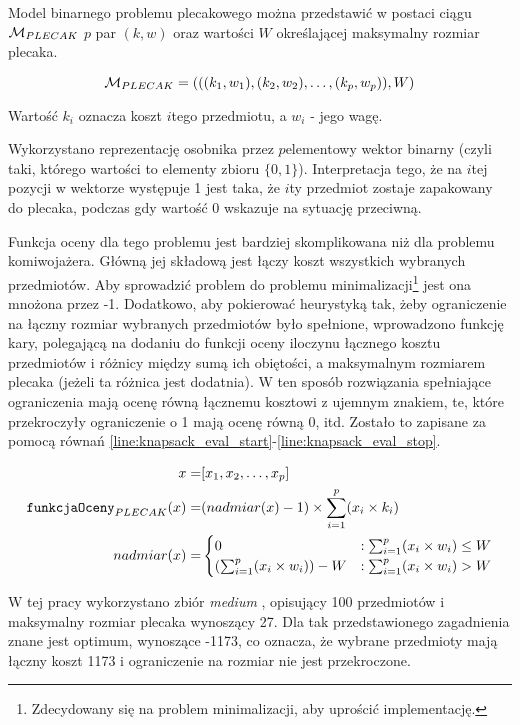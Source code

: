 \documentclass[./FM_mgr.tex]{subfiles}
\begin{document}
	Model binarnego problemu plecakowego można przedstawić w postaci ciągu $\mathcal{M}_{PLECAK}$ $p$ par $(k, w)$ oraz wartości $W$ określającej maksymalny rozmiar plecaka.
	
	\begin{displaymath}
	\mathcal{M}_{PLECAK} = ( ((k_1, w_1), (k_2, w_2), \ldots, (k_p, w_p)), W)
	\end{displaymath}
	
	Wartość $k_i$ oznacza koszt $i$tego przedmiotu, a $w_i$ - jego wagę.
	
	Wykorzystano reprezentację osobnika przez $p$elementowy wektor binarny (czyli taki, którego wartości to elementy zbioru $\{0, 1\}$).
	Interpretacja tego, że na $i$tej pozycji w wektorze występuje 1 jest taka, że $i$ty przedmiot zostaje zapakowany do plecaka, podczas gdy wartość 0 wskazuje na sytuację przeciwną.
	
	Funkcja oceny dla tego problemu jest bardziej skomplikowana niż dla problemu komiwojażera. Główną jej składową jest łączy koszt wszystkich wybranych przedmiotów.
	Aby sprowadzić problem do problemu minimalizacji\footnote{
		Zdecydowany się na problem minimalizacji, aby uprościć implementację.
	} jest ona mnożona przez -1.
	Dodatkowo, aby pokierować heurystyką tak, żeby ograniczenie na łączny rozmiar wybranych przedmiotów było spełnione, wprowadzono funkcję kary, polegającą na dodaniu do funkcji oceny iloczynu łącznego kosztu przedmiotów i różnicy między sumą ich obiętości, a maksymalnym rozmiarem plecaka (jeżeli ta różnica jest dodatnia).
	W ten sposób rozwiązania spełniające ograniczenia mają ocenę równą łącznemu kosztowi z ujemnym znakiem, te, które przekroczyły ograniczenie o 1 mają ocenę równą 0, itd.
	Zostało to zapisane za pomocą równań \ref{line:knapsack_eval_start}-\ref{line:knapsack_eval_stop}.
	
	\begin{align}
	\label{line:knapsack_eval_start}
	x = &[x_1, x_2, \ldots, x_p] \\
	\mathtt{funkcjaOceny}_{PLECAK}(x) = &(nadmiar(x)-1) \times \sum_{i=1}^{p} (x_i \times k_i) \\
	nadmiar(x) = &\begin{cases}
	0 &: \sum_{i=1}^{p} (x_i \times w_i) \leq W \\
	(\sum_{i=1}^{p} (x_i \times w_i)) - W &: \sum_{i=1}^{p} (x_i \times w_i) > W
	\end{cases}
	\label{line:knapsack_eval_stop}
	\end{align}
	
	W tej pracy wykorzystano zbiór \emph{medium} \cite{knapsack_data}, opisujący 100 przedmiotów i maksymalny rozmiar plecaka wynoszący 27.
	Dla tak przedstawionego zagadnienia znane jest optimum, wynoszące -1173, co oznacza, że wybrane przedmioty mają łączny koszt 1173 i ograniczenie na rozmiar nie jest przekroczone.
	
\end{document}

